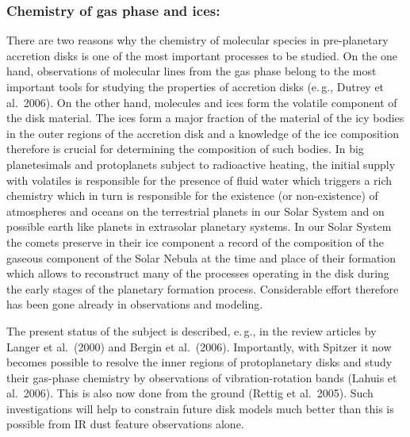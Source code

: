 \subsubsection{Chemistry of gas phase and ices:}
There are two reasons why the chemistry of molecular species in
pre-planetary accretion disks is one of the most important
processes to be studied. On the one hand, observations of
molecular lines from the gas phase belong to the most important
tools for studying the properties of accretion disks (e.\,g.,
Dutrey et al.~2006). On the other hand, molecules and ices form
the volatile component of the disk material. The ices form a major
fraction of the material of the icy bodies in the outer regions of
the accretion disk and a knowledge of the ice composition
therefore is crucial for determining the composition of such
bodies. In big planetesimals and protoplanets subject to
radioactive heating, the initial supply with volatiles is
responsible for the presence of fluid water which triggers a rich
chemistry which in turn is responsible for the existence (or
non-existence) of atmospheres and oceans on the terrestrial
planets in our Solar System and on possible earth like planets in
extrasolar planetary systems. In our Solar System the comets
preserve in their ice component a record of the composition of the
gaseous component of the Solar Nebula at the time and place of
their formation which allows to reconstruct many of the processes
operating in the disk during the early stages of the planetary
formation process. Considerable effort therefore has been gone
already in observations and modeling.%

The present status of the subject is described, e.\,g., in the
review articles by Langer et al.~(2000) and Bergin et al.~(2006).
Importantly, with Spitzer it now becomes possible to
resolve the inner regions of protoplanetary disks and
study their gas-phase chemistry by observations of
vibration-rotation bands (Lahuis et al.~2006). This is also now
done from the ground (Rettig et al.~2005). Such investigations
will help to constrain future disk models much better than this is
possible from IR dust feature observations alone.

